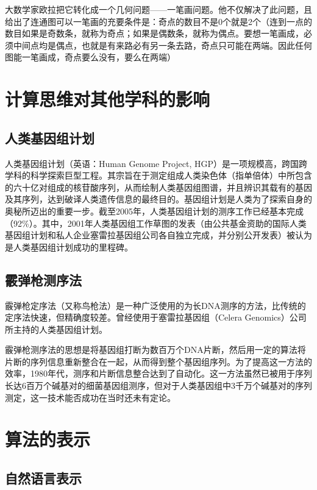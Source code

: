 大数学家欧拉把它转化成一个几何问题——一笔画问题。他不仅解决了此问题，且给出了连通图可以一笔画的充要条件是：奇点的数目不是0个就是2个（连到一点的数目如果是奇数条，就称为奇点；如果是偶数条，就称为偶点。要想一笔画成，必须中间点均是偶点，也就是有来路必有另一条去路，奇点只可能在两端。因此任何图能一笔画成，奇点要么没有，要么在两端）

\section{计算思维对其他学科的影响}

\subsection{人类基因组计划}

人类基因组计划（英语：Human Genome Project, HGP）是一项规模高，跨国跨学科的科学探索巨型工程。其宗旨在于测定组成人类染色体（指单倍体）中所包含的六十亿对组成的核苷酸序列，从而绘制人类基因组图谱，并且辨识其载有的基因及其序列，达到破译人类遗传信息的最终目的。基因组计划是人类为了探索自身的奥秘所迈出的重要一步。截至2005年，人类基因组计划的测序工作已经基本完成（92\%）。其中，2001年人类基因组工作草图的发表（由公共基金资助的国际人类基因组计划和私人企业塞雷拉基因组公司各自独立完成，并分别公开发表）被认为是人类基因组计划成功的里程碑。

\subsection{霰弹枪测序法}

霰弹枪定序法（又称鸟枪法）是一种广泛使用的为长DNA测序的方法，比传统的定序法快速，但精确度较差。曾经使用于塞雷拉基因组（Celera Genomics）公司所主持的人类基因组计划。

霰弹枪测序法的思想是将基因组打断为数百万个DNA片断，然后用一定的算法将片断的序列信息重新整合在一起，从而得到整个基因组序列。为了提高这一方法的效率，1980年代，测序和片断信息整合达到了自动化。这一方法虽然已被用于序列长达6百万个碱基对的细菌基因组测序，但对于人类基因组中3千万个碱基对的序列测定，这一技术能否成功在当时还未有定论。

\section{算法的表示}

\subsection{自然语言表示}

